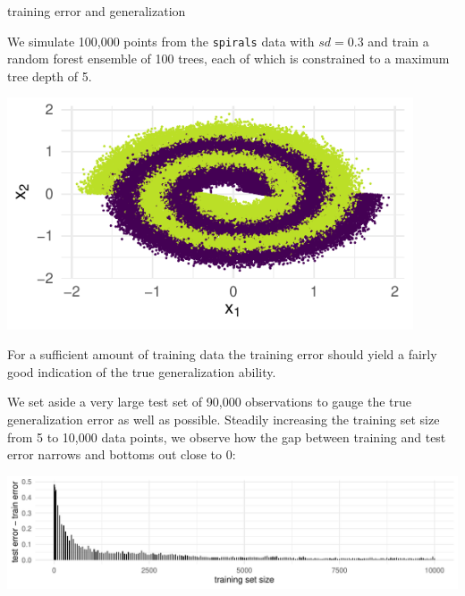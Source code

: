 \documentclass[11pt,compress,t,notes=noshow, xcolor=table]{beamer}
\begin{document}
\begin{vbframe}{training error and generalization}

\begin{minipage}[c]{0.6\textwidth}
  \small
  We simulate 100,000 points from the \texttt{spirals} data with $sd = 0.3$ and 
  train a random forest ensemble of 100 trees, each of which is constrained to 
  a maximum tree depth of 5.
\end{minipage}%
\begin{minipage}[c]{0.05\textwidth}
  \phantom{foo}
\end{minipage}%
\begin{minipage}[c]{0.35\textwidth}
  \includegraphics[width = 0.9\textwidth]{figure/eval_delta_train_test_err_data}
\end{minipage}%

\vfill

\small

For a sufficient amount of training data the training error should yield a 
fairly good indication of the true generalization ability.

\vfill

We set aside a very large test set of 90,000 observations to gauge the true 
generalization error as well as possible.
Steadily increasing the training set size from 5 to 10,000 data points, we 
observe how the gap between training and test error narrows and bottoms 
out close to 0:

\vfill

\includegraphics[width = \textwidth]{figure/eval_delta_train_test_err}


\end{vbframe}
\end{document}

